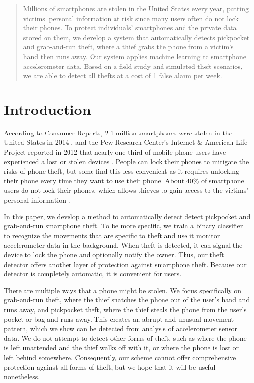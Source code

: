 \documentclass{soups}
\begin{document}
\maketitle
\begin{abstract}
Millions of smartphones are stolen in the United States every year, putting victims' personal information at risk since many users often do not lock their phones. 
To protect individuals' smartphones and the private data stored on them, we develop a system that automatically detects pickpocket and grab-and-run theft, where a thief grabs the phone from a victim's hand then runs away. 
Our system applies machine learning to smartphone accelerometer data. Based on a field study and simulated theft scenarios, we are able to detect all thefts at a cost of 1 false alarm per week.
\end{abstract}




\section{Introduction}
According to Consumer Reports, 2.1 million smartphones were stolen in the United States in 2014 \cite{deitrick:consumer}, and the Pew Research Center's Internet \& American Life Project reported in 2012 that nearly one third of mobile phone users have experienced a lost or stolen devices \cite{boyles:pew}.
People can lock their phones to mitigate the risks of phone theft, but some find this less convenient as it requires unlocking their phone every time they want to use their phone.
About 40\% of smartphone users do not lock their phones, which allows thieves to gain access to the victims' personal information \cite{egelman:lock}.

In this paper, we develop a method to automatically detect detect pickpocket and grab-and-run smartphone theft. To be more specific, we train a binary classifier to recognize the movements that are specific to theft and use it monitor accelerometer data in the background.
When theft is detected, it can signal the device to lock the phone and optionally notify the owner. Thus, our theft detector offers another layer of protection against smartphone theft.
Because our detector is completely automatic, it is convenient for users.

There are multiple ways that a phone might be stolen.
We focus specifically on grab-and-run theft, where the thief snatches the phone out of the user's hand and runs away, and pickpocket theft, where the thief steals the phone from the user's pocket or bag and runs away.
This creates an abrupt and unusual movement pattern, which we show can be detected from analysis of accelerometer sensor data.
We do not attempt to detect other forms of theft, such as where the phone is left unattended and the thief walks off with it, or where the phone is lost or left behind somewhere.
Consequently, our scheme cannot offer comprehensive protection against all forms of theft, but we hope that it will be useful nonetheless.
\end{document}
